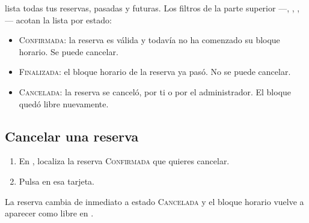  lista todas tus reservas, pasadas y futuras. Los
filtros de la parte superior —, ,
, — acotan la lista por estado:

\begin{itemize}
  \item \textsc{Confirmada}: la reserva es válida y todavía no ha
        comenzado su bloque horario. Se puede cancelar.
  \item \textsc{Finalizada}: el bloque horario de la reserva ya pasó. No
        se puede cancelar.
  \item \textsc{Cancelada}: la reserva se canceló, por ti o por el
        administrador. El bloque quedó libre nuevamente.
\end{itemize}


\subsection{Cancelar una reserva}
\label{sec:usuario:cancelar}

\begin{enumerate}
  \item En , localiza la reserva \textsc{Confirmada}
        que quieres cancelar.
  \item Pulsa  en esa tarjeta.
\end{enumerate}

La reserva cambia de inmediato a estado \textsc{Cancelada} y el bloque
horario vuelve a aparecer como libre en .



